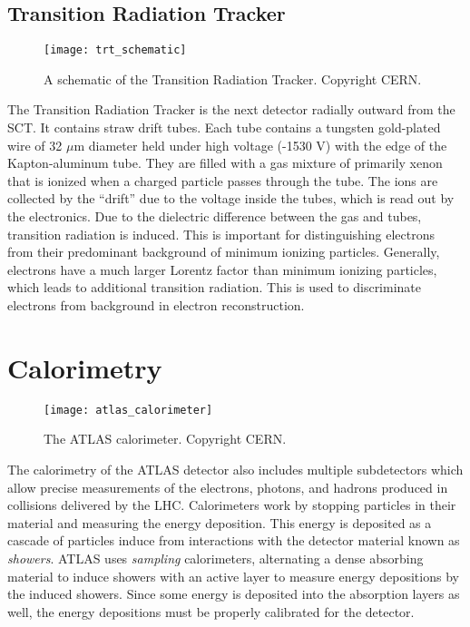 \subsection{Transition Radiation Tracker}
\begin{figure}
\caption{A schematic of the Transition Radiation Tracker. Copyright CERN.} \label{fig:trt_schematic}
\texttt{[image: trt\_schematic]}
\end{figure}
The Transition Radiation Tracker is the next detector radially outward from the SCT.
It contains straw drift tubes.
Each tube contains a tungsten gold-plated wire of 32 $\mu$m diameter held under high voltage (-1530 V) with the edge of the Kapton-aluminum tube.
They are filled with a gas mixture of primarily xenon that is ionized when a charged particle passes through the tube.
The ions are collected by the ``drift'' due to the voltage inside the tubes, which is read out by the electronics.
Due to the dielectric difference between the gas and tubes, transition radiation is induced.
This is important for distinguishing electrons from their predominant background of minimum ionizing particles.
Generally, electrons have a much larger Lorentz factor than minimum ionizing particles, which leads to additional transition radiation.
This is used to discriminate electrons from background in electron reconstruction.

\section{Calorimetry}
\begin{figure}
\caption{The ATLAS calorimeter. Copyright CERN.} \label{fig:atlas_calorimeter}
\texttt{[image: atlas\_calorimeter]}
\end{figure}

The calorimetry of the ATLAS detector also includes multiple subdetectors which allow precise measurements of the electrons, photons, and hadrons produced in collisions delivered by the LHC.
Calorimeters work by stopping particles in their material and measuring the energy deposition.
This energy is deposited as a cascade of particles induce from interactions with the detector material known as \textit{showers}.
ATLAS uses \textit{sampling} calorimeters, alternating a dense absorbing material to induce showers with an active layer to measure energy depositions by the induced showers.
Since some energy is deposited into the absorption layers as well, the energy depositions must be properly calibrated for the detector.

